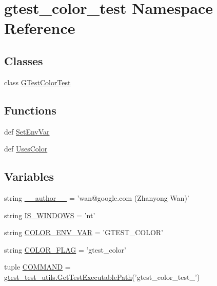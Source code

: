 \hypertarget{namespacegtest__color__test}{\section{gtest\-\_\-color\-\_\-test \-Namespace \-Reference}
\label{dd/dee/namespacegtest__color__test}
}
\subsection*{\-Classes}
\begin{DoxyCompactItemize}
\item 
class \hyperlink{classgtest__color__test_1_1GTestColorTest}{\-G\-Test\-Color\-Test}
\end{DoxyCompactItemize}
\subsection*{\-Functions}
\begin{DoxyCompactItemize}
\item 
def \hyperlink{namespacegtest__color__test_a775501fab86844e0d96a0df6b2a0a927}{\-Set\-Env\-Var}
\item 
def \hyperlink{namespacegtest__color__test_ac37cf66941952ac6fc423c97454b4f76}{\-Uses\-Color}
\end{DoxyCompactItemize}
\subsection*{\-Variables}
\begin{DoxyCompactItemize}
\item 
string \hyperlink{namespacegtest__color__test_a629d61dfe4da763164a4d1a2d85b0afd}{\-\_\-\-\_\-author\-\_\-\-\_\-} = 'wan@google.\-com (\-Zhanyong \-Wan)'
\item 
string \hyperlink{namespacegtest__color__test_ab1b21b880253abfa3ab3dfc19b06814c}{\-I\-S\-\_\-\-W\-I\-N\-D\-O\-W\-S} = 'nt'
\item 
string \hyperlink{namespacegtest__color__test_a162b19458831d7c0d493de2abd006748}{\-C\-O\-L\-O\-R\-\_\-\-E\-N\-V\-\_\-\-V\-A\-R} = '\-G\-T\-E\-S\-T\-\_\-\-C\-O\-L\-O\-R'
\item 
string \hyperlink{namespacegtest__color__test_ac6096dcc753c3d955535dbbb74c8c538}{\-C\-O\-L\-O\-R\-\_\-\-F\-L\-A\-G} = 'gtest\-\_\-color'
\item 
tuple \hyperlink{namespacegtest__color__test_add010199942a26d17bd560c1ce462eeb}{\-C\-O\-M\-M\-A\-N\-D} = \hyperlink{namespacegtest__test__utils_a1bdf3cac86afa675ed37629b183048e9}{gtest\-\_\-test\-\_\-utils.\-Get\-Test\-Executable\-Path}('gtest\-\_\-color\-\_\-test\-\_\-')
\end{DoxyCompactItemize}


